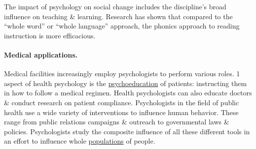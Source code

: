 \documentclass[oneside]{book}
\numberwithin{equation}{section}
\begin{document}
The impact of psychology on social change includes the discipline's broad influence on teaching \& learning. Research has shown that compared to the ``whole word'' or ``whole language'' approach, the phonics approach to reading instruction is more efficacious.

\paragraph{Medical applications.} Medical facilities increasingly employ psychologists to perform various roles. 1 aspect of health psychology is the \href{https://en.wikipedia.org/wiki/Psychoeducation}{psychoeducation} of patients: instructing them in how to follow a medical regimen. Health psychologists can also educate doctors \& conduct research on patient compliance. Psychologists in the field of public health use a wide variety of interventions to influence human behavior. These range from public relations campaigns \& outreach to governmental laws \& policies. Psychologists study the composite influence of all these different tools in an effort to influence whole \href{https://en.wikipedia.org/wiki/Population}{populations} of people.
\end{document}
